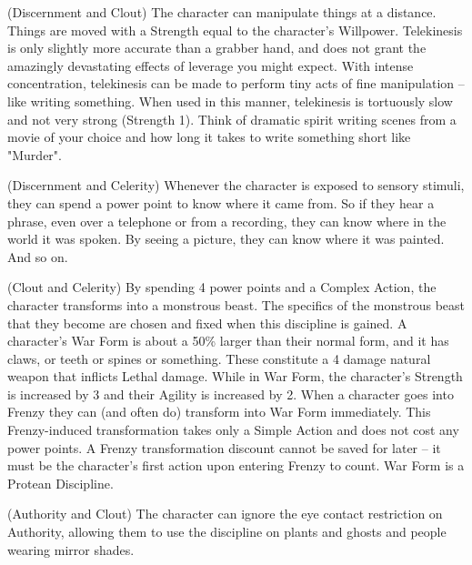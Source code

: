  (Discernment and Clout)
The character can manipulate things at a distance. Things are moved with a Strength equal to the character's Willpower. Telekinesis is only slightly more accurate than a grabber hand, and does not grant the amazingly devastating effects of leverage you might expect. With intense concentration, telekinesis can be made to perform tiny acts of fine manipulation -- like writing something. When used in this manner, telekinesis is tortuously slow and not very strong (Strength 1). Think of dramatic spirit writing scenes from a movie of your choice and how long it takes to write something short like "Murder".

 (Discernment and Celerity)
Whenever the character is exposed to sensory stimuli, they can spend a power point to know where it came from. So if they hear a phrase, even over a telephone or from a recording, they can know where in the world it was spoken. By seeing a picture, they can know where it was painted. And so on.

 (Clout and Celerity)
By spending 4 power points and a Complex Action, the character transforms into a monstrous beast. The specifics of the monstrous beast that they become are chosen and fixed when this discipline is gained. A character's War Form is about a 50\% larger than their normal form, and it has claws, or teeth or spines or something. These constitute a 4 damage natural weapon that inflicts Lethal damage. While in War Form, the character's Strength is increased by 3 and their Agility is increased by 2. When a character goes into Frenzy they can (and often do) transform into War Form immediately. This Frenzy-induced transformation takes only a Simple Action and does not cost any power points. A Frenzy transformation discount cannot be saved for later -- it must be the character's first action upon entering Frenzy to count. War Form is a Protean Discipline.

 (Authority and Clout)
The character can ignore the eye contact restriction on Authority, allowing them to use the discipline on plants and ghosts and people wearing mirror shades.
